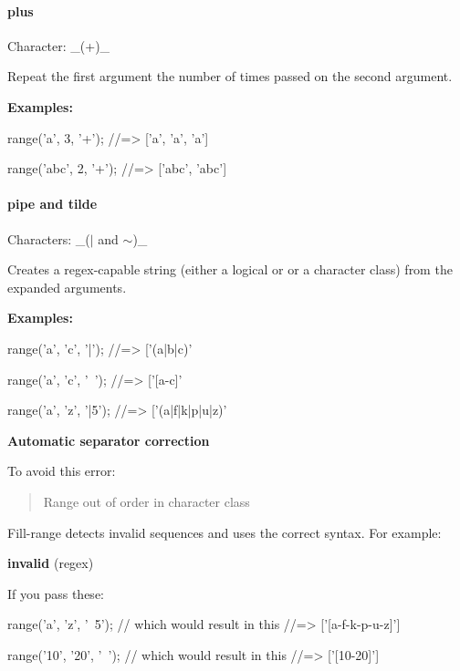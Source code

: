 \paragraph*{plus}

Character\+: \+\_\+({\ttfamily +})\+\_\+

Repeat the first argument the number of times passed on the second argument.

{\bfseries Examples\+:}


\begin{DoxyCode}
range('a', 3, '+');
//=> ['a', 'a', 'a']

range('abc', 2, '+');
//=> ['abc', 'abc']
\end{DoxyCode}


\paragraph*{pipe and tilde}

Characters\+: \+\_\+({\ttfamily $\vert$} and {\ttfamily $\sim$})\+\_\+

Creates a regex-\/capable string (either a logical {\ttfamily or} or a character class) from the expanded arguments.

{\bfseries Examples\+:}


\begin{DoxyCode}
range('a', 'c', '|');
//=> ['(a|b|c)'

range('a', 'c', '~');
//=> ['[a-c]'

range('a', 'z', '|5');
//=> ['(a|f|k|p|u|z)'
\end{DoxyCode}


{\bfseries Automatic separator correction}

To avoid this error\+:

\begin{quote}
{\ttfamily Range out of order in character class} \end{quote}


Fill-\/range detects invalid sequences and uses the correct syntax. For example\+:

{\bfseries invalid} (regex)

If you pass these\+:


\begin{DoxyCode}
range('a', 'z', '~5');
// which would result in this
//=> ['[a-f-k-p-u-z]']

range('10', '20', '~');
// which would result in this
//=> ['[10-20]']
\end{DoxyCode}


